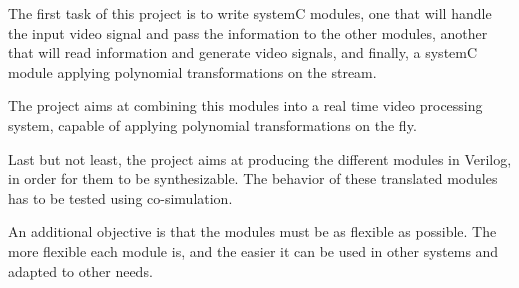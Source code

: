 \documentclass[a4paper,10pt]{article}
\begin{document}
The first task of this project is to write systemC modules, one that will handle the input video signal and pass the information to the other modules, another that will read information and generate video signals, and finally, a systemC module applying polynomial transformations on the stream.

The project aims at combining this modules into a real time video processing system, capable of applying polynomial transformations on the fly.

Last but not least, the project aims at producing the different modules in Verilog, in order for them to be synthesizable. The behavior of these translated modules has to be tested using co-simulation.

An additional objective is that the modules must be as flexible as possible. The more flexible each module is, and the easier it can be used in other systems and adapted to other needs.








\end{document}
